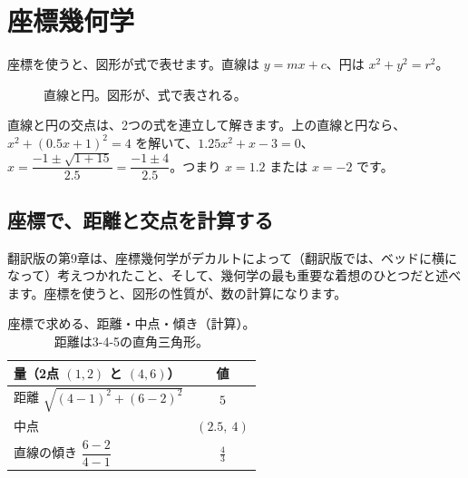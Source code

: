 \documentclass[a4paper,11pt,openany]{ltjsbook}
\begin{document}
\chapter{座標幾何学}

座標を使うと、図形が式で表せます。直線は $y=mx+c$、円は $x^2+y^2=r^2$。

\begin{figure}[htbp]
\centering
{}
\caption{直線と円。図形が、式で表される。}
\end{figure}

直線と円の交点は、2つの式を連立して解きます。上の直線と円なら、$x^2+(0.5x+1)^2=4$ を解いて、$1.25x^2+x-3=0$、$x=\dfrac{-1\pm\sqrt{1+15}}{2.5}=\dfrac{-1\pm4}{2.5}$。つまり $x=1.2$ または $x=-2$ です。


\section{座標で、距離と交点を計算する}

翻訳版の第9章は、座標幾何学がデカルトによって（翻訳版では、ベッドに横になって）考えつかれたこと、そして、幾何学の最も重要な着想のひとつだと述べます。座標を使うと、図形の性質が、数の計算になります。

\begin{table}[htbp]
\centering
\begin{tabular}{lc}
\toprule
量（2点 $(1,2)$ と $(4,6)$） & 値\\
\midrule
距離 $\sqrt{(4-1)^2+(6-2)^2}$ & $5$\\
中点 & $(2.5,\ 4)$\\
直線の傾き $\dfrac{6-2}{4-1}$ & $\tfrac43$\\
\bottomrule
\end{tabular}
\caption{座標で求める、距離・中点・傾き（計算）。距離は3-4-5の直角三角形。}
\end{table}
\end{document}
